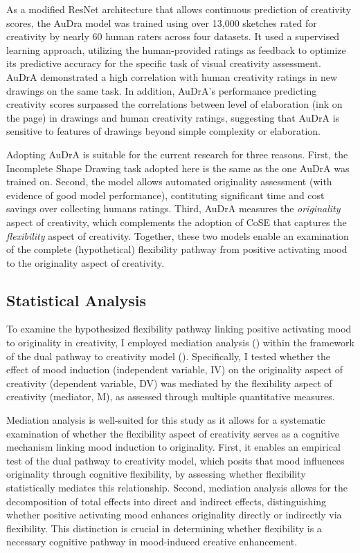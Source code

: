 \documentclass[../MA_Thesis.tex]{subfiles}
\begin{document}
As a modified ResNet architecture that allows continuous prediction of creativity scores, the AuDra model was trained using over 13,000 sketches rated for creativity by nearly 60 human raters across four datasets. It used a supervised learning approach, utilizing the human-provided ratings as feedback to optimize its predictive accuracy for the specific task of visual creativity assessment. AuDrA demonstrated a high correlation with human creativity ratings in new drawings on the same task. In addition, AuDrA's performance predicting creativity scores surpassed the correlations between level of elaboration (ink on the page) in drawings and human creativity ratings, suggesting that AuDrA is sensitive to features of drawings beyond simple complexity or elaboration. 

Adopting AuDrA is suitable for the current research for three reasons. First, the Incomplete Shape Drawing task adopted here is the same as the one AuDrA was trained on. Second, the model allows automated originality assessment (with evidence of good model performance), contituting significant time and cost savings over collecting humans ratings. Third, AuDrA measures the \textit{originality} aspect of creativity, which complements the adoption of CoSE that captures the \textit{flexibility} aspect of creativity. Together, these two models enable an examination of the complete (hypothetical) flexibility pathway from positive activating mood to the originality aspect of creativity.

\subsection*{Statistical Analysis}

To examine the hypothesized flexibility pathway linking positive activating mood to originality in creativity, I employed mediation analysis (\cite{mackinnon_mediation_2007}) within the framework of the dual pathway to creativity model (\cite{de_dreu_hedonic_2008}). Specifically, I tested whether the effect of mood induction (independent variable, IV) on the originality aspect of creativity (dependent variable, DV) 
was mediated by the flexibility aspect of creativity (mediator, M), as assessed through multiple quantitative measures.

Mediation analysis is well-suited for this study as it allows for a systematic examination of whether the flexibility aspect of creativity serves as a cognitive mechanism linking mood induction to originality. First, it enables an empirical test of the dual pathway to creativity model, which posits that mood influences originality through cognitive flexibility, by assessing whether flexibility statistically mediates this relationship. Second, mediation analysis allows for the decomposition of total effects into direct and indirect effects, distinguishing whether positive activating mood enhances originality directly or indirectly via flexibility. This distinction is crucial in determining whether flexibility is a necessary cognitive pathway in mood-induced creative enhancement.
\end{document}
